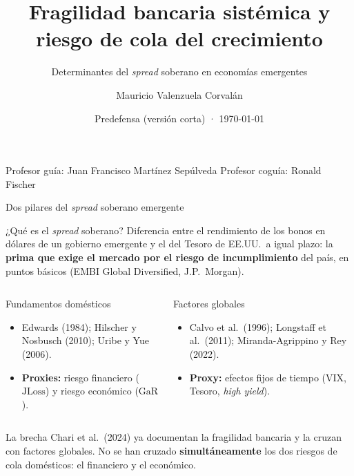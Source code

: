 \documentclass[aspectratio=169]{beamer}
\author{Mauricio Valenzuela Corvalán}
\institute[Universidad de Chile]{Departamento de Ingeniería Civil Industrial\\
\small Magíster en Economía Aplicada · Universidad de Chile}
\title[Fragilidad bancaria y riesgo de cola]{Fragilidad bancaria sistémica y riesgo de cola del crecimiento}
\subtitle{Determinantes del \textit{spread} soberano en economías emergentes}
\date{Predefensa (versión corta) · \today}
\newcommand{\JLoss}{\mathrm{JLoss}}
\newcommand{\GaR}{\mathrm{GaR}}
\begin{document}
\begin{frame}
\titlepage
\vspace{-8pt}
\centering
\footnotesize Profesor guía: Juan Francisco Martínez Sepúlveda \quad\quad
Profesor coguía: Ronald Fischer
\end{frame}

\begin{frame}{Dos pilares del \textit{spread} soberano emergente}
\begin{exampleblock}{¿Qué es el \textit{spread} soberano?}
\footnotesize Diferencia entre el rendimiento de los bonos en dólares de un gobierno emergente y el del Tesoro de EE.UU.\ a igual plazo: la \textbf{prima que exige el mercado por el riesgo de incumplimiento} del país, en puntos básicos (EMBI Global Diversified, J.P.\ Morgan).
\end{exampleblock}
\vspace{-10pt}
\begin{columns}[T]
\begin{block}{Fundamentos domésticos}
\footnotesize
\begin{itemize}
\item Edwards (1984); Hilscher y Nosbusch (2010); Uribe y Yue (2006).
\item \textbf{Proxies:} riesgo financiero ($\JLoss$) y riesgo económico ($\GaR$).
\end{itemize}
\end{block}
\begin{block}{Factores globales}
\footnotesize
\begin{itemize}
\item Calvo et al.\ (1996); Longstaff et al.\ (2011); Miranda-Agrippino y Rey (2022).
\item \textbf{Proxy:} efectos fijos de tiempo (VIX, Tesoro, \textit{high yield}).
\end{itemize}
\end{block}
\end{columns}
\begin{alertblock}{La brecha}
\footnotesize Chari et al.\ (2024) ya documentan la fragilidad bancaria y la cruzan con factores globales. No se han cruzado \textbf{simultáneamente} los dos riesgos de cola domésticos: el financiero y el económico.
\end{alertblock}
\end{frame}
\end{document}
